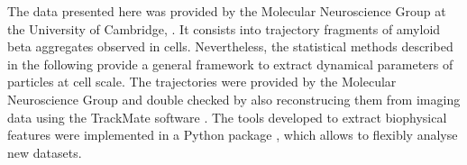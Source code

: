 The data presented here was provided by the Molecular Neuroscience Group at the University of Cambridge, . It consists into trajectory fragments of amyloid beta aggregates observed in  cells. Nevertheless, the statistical methods described in the following provide a general framework to extract dynamical parameters of particles at cell scale. The  trajectories were provided by the Molecular Neuroscience Group and double checked by also reconstrucing them from imaging data using the TrackMate software \cite{trackmate}. The tools developed to extract biophysical features were implemented in a Python package \cite{sptx}, which allows to flexibly analyse new datasets.
%
%
%
%
